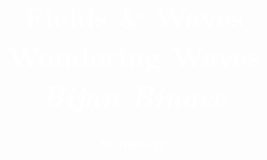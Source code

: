 

\newcommand{\confTitle}{Fields \& Waves} %
\newcommand{\hmwkDueDate}{Wondering Waves} %
\newcommand{\Places}{Bijan Binaee} %
\newcommand{\confCompany}{Summary} %


\title{
\vspace{3.5in}
\textcolor{white}{\textmd{\fontsize{40}{40}\textbf{\confTitle}}\\
\vspace{3.75in}
\small{\hmwkDueDate}\\
\large{\textit{\Places}}
}
}


\author{\textcolor{white}{\textbf{\confCompany}}}
\date{} %


